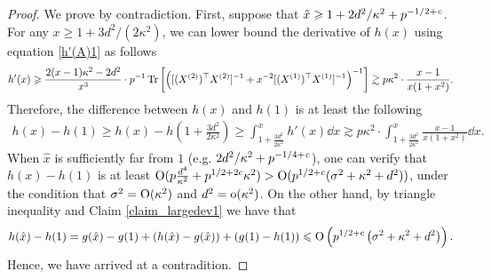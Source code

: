 \begin{proof}
We prove by contradiction.
First, suppose that $\hat{x} \geqslant 1 + 2d^2 /\kappa^2 + p^{-1/2 + {\mathit{c}}}$.
For any $x \ge 1+3d^2/(2\kappa^2)$, we can lower bound the derivative of $h(x)$ using equation \eqref{h'(A)1} as follows
	\[ h'(x) \geqslant \frac{2(x-1)\kappa^2 - 2d^2}{x^3} \cdot p^{-1} \operatorname{Tr}\left[\left([(X^{(2)})^\top X^{(2)}]^{-1} + x^{-2} [(X^{(1)})^\top X^{(1)}]^{-1}\right)^{-1}\right]
	\gtrsim p\kappa^2\cdot \frac{x-1}{x (1 + x^2)}. \]
Therefore, the difference between $h(x)$ and $h(1)$ is at least the following
\begin{align*}
		h(x)-h(1) \ge h(x) - h\left(1+\frac{3d^2}{2\kappa^2}\right)
	\ge \int_{1+\frac{3d^2}{2\kappa^2}}^x h'(x)\dd x \gtrsim p\kappa^2 \cdot \int_{1 + \frac{3d^2}{2\kappa^2}}^x \frac{x-1}{x(1 + x^2)} \dd x.
\end{align*}
When $\hat{x}$ is sufficiently far from $1$ (e.g. $2d^2 / \kappa^2 + p^{-1/4+{\mathit{c}}}$), one can verify that $h(x) - h(1)$ is at least $\operatorname{O}(p\frac{d^4}{\kappa^2} + p^{1/2+2c} \kappa^2) > \operatorname{O}(p^{1/2 + c} (\sigma^2 + \kappa^2 + d^2))$, under the condition that $\sigma^2 =\operatorname{O}( \kappa^2)$ and $d^2 =\operatorname{o}({\kappa^2})$.
On the other hand, by triangle inequality and Claim \ref{claim_largedev1} we have that
\begin{align*}
	h(\hat{x}) - h(1) = g(\hat{x}) - g(1) + (h(\hat{x}) - g(\hat{x})) + (g(1) - h(1))
	\leqslant \operatorname{O}\left(p^{1/2+c}\left(\sigma^2 +\kappa^2+d^2 \right)\right).
\end{align*}
Hence, we have arrived at a contradition.



\end{proof}
